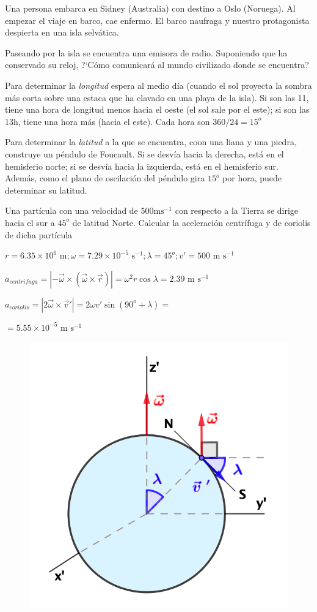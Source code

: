 \begin{prob}
Una persona embarca en Sidney (Australia) con destino a Oslo (Noruega). Al empezar el viaje en barco, cae enfermo. El barco naufraga y nuestro protagonista despierta en una isla selvática. 

Paseando por la isla se encuentra una emisora de radio. Suponiendo que ha conservado su reloj, ?`Cómo comunicará al mundo civilizado donde se encuentra?	
\end{prob}

Para determinar la \emph{longitud} espera al medio día (cuando el sol proyecta la sombra más corta sobre una estaca que ha clavado en una playa de la isla). Si son las 11, tiene una hora de longitud menos hacia el oeste (el sol sale por el este); si son las 13h, tiene una hora más (hacia el este). Cada hora son $360/24=15^o$


Para determinar la \emph{latitud} a la que se encuentra, coon una liana y una piedra, construye un péndulo de Foucault. Si se desvía hacia la derecha, está en el hemisferio norte; si se desvía hacia la izquierda, está en el hemisferio sur. Además, como el plano de oscilación del péndulo gira $15^o$ por hora, puede determinar su latitud.

\begin{prob}
	Una partícula con una velocidad de $500 \mathrm{m s}^{-1}$ con respecto a la Tierra se dirige hacia el sur a $45^o$ de latitud Norte. Calcular la aceleración centrífuga y de coriolis de dicha partícula
\end{prob}
\begin{multicols}{2}
$r=6.35 \times 10^6 \text{ m}; \omega=7.29 \times 10^{-5} \text{ s}^{-1}; \lambda=45^o; v'=500 \text{ m s}^{-1}$

$a_{centrifuga}=|-\vec \omega \times (\vec \omega \times \vec r)|=\omega^2 r \cos \lambda = 2.39 \text{ m s}^{-1}$

$a_{coriolis}=|2\vec \omega \times \vec v '|=2\omega v' \sin(90^o+\lambda)= $

$=5.55 \times 10^{-5} \text{ m s}^{-1}$
\begin{figure}[H]
	\centering
	\includegraphics[width=.4\textwidth]{imagenes/imagenes11/T11IM15.png}
\end{figure}	
\end{multicols}


